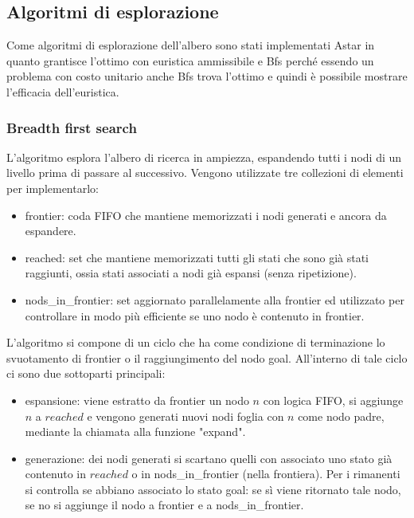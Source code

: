 \documentclass{article}
\begin{document}
\subsection{Algoritmi di esplorazione}

Come algoritmi di esplorazione dell'albero sono stati implementati Astar in quanto grantisce l'ottimo con euristica ammissibile e Bfs perché essendo un problema con costo unitario anche Bfs trova l'ottimo e quindi è possibile mostrare l'efficacia dell'euristica.

\subsubsection*{Breadth first search}
L'algoritmo esplora l'albero di ricerca in ampiezza, espandendo tutti i nodi di un livello prima di passare al successivo.
Vengono utilizzate tre collezioni di elementi per implementarlo:

\begin{itemize}
  \item frontier: coda FIFO che mantiene memorizzati i nodi generati e ancora da espandere.
  \item reached: set che mantiene memorizzati tutti gli stati che sono già stati raggiunti, ossia stati associati a nodi già espansi (senza ripetizione).
  \item nods\_in\_frontier: set aggiornato parallelamente alla frontier ed utilizzato per controllare in modo più efficiente se uno nodo è contenuto in frontier.
\end{itemize} 


\noindent L'algoritmo si compone di un ciclo che ha come condizione di terminazione lo svuotamento di frontier o il raggiungimento del nodo goal.
All'interno di tale ciclo ci sono due sottoparti principali:

\begin{itemize}
  \item espansione: viene estratto da frontier un nodo $n$ con logica FIFO, si aggiunge $n$ a $reached$ e vengono generati nuovi nodi foglia con $n$ come nodo padre, mediante la chiamata alla funzione "expand".
  \item generazione: dei nodi generati si scartano quelli con associato uno stato già contenuto in $reached$ o in nods\_in\_frontier (nella frontiera). Per i rimanenti si controlla se abbiano associato lo stato goal: se sì viene ritornato tale nodo, se no si aggiunge il nodo a frontier e a nods\_in\_frontier.

\end{itemize}
\end{document}
